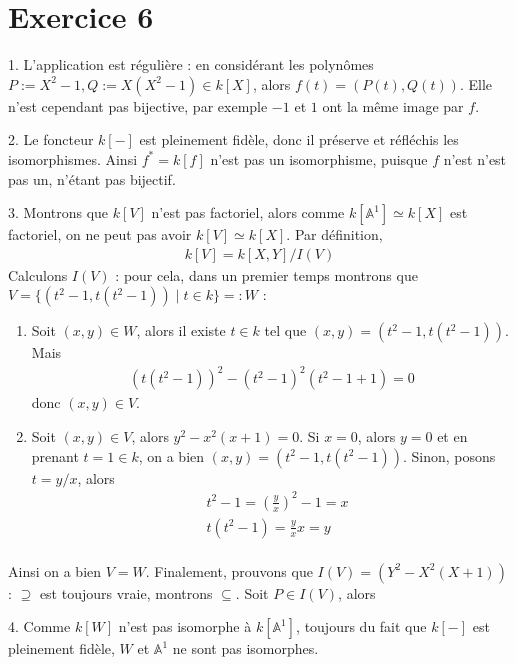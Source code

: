     \section{Exercice 6}
        \begin{question}{1.}
            L'application est régulière : en considérant les polynômes $P := X^2 - 1, Q := X(X^2 - 1) \in k[X]$, alors $f(t) = (P(t), Q(t))$. Elle n'est cependant pas bijective, par exemple $-1$ et $1$ ont la même image par $f$.
        \end{question}
        \begin{question}{2.}
            Le foncteur $k[-]$ est pleinement fidèle, donc il préserve et réfléchis les isomorphismes. Ainsi $f^* = k[f]$ n'est pas un isomorphisme, puisque $f$ n'est n'est pas un, n'étant pas bijectif.
        \end{question}
        \begin{question}{3.}
            Montrons que $k[V]$ n'est pas factoriel, alors comme $k[\mathbb{A}^1] \simeq k[X]$ est factoriel, on ne peut pas avoir $k[V] \simeq k[X]$. Par définition,
            \begin{align*}
                k[V] = k[X,Y]/I(V)
            \end{align*}
            Calculons $I(V)$ : pour cela, dans un premier temps montrons que $V = \{(t^2 - 1, t(t^2 - 1)) \mid t \in k \} =: W$ :
            \begin{enumerate}
                \item Soit $(x,y) \in W$, alors il existe $t \in k$ tel que $(x,y) = (t^2 - 1, t(t^2 - 1))$. Mais
                \begin{align*}
                    (t(t^2 - 1))^2 - (t^2 - 1)^2(t^2 - 1 + 1)= 0
                \end{align*}
                donc $(x,y) \in V$.
                \item Soit $(x,y) \in V$, alors $y^2 - x^2(x+1) = 0$. Si $x = 0$, alors $y = 0$ et en prenant $t = 1 \in k$, on a bien $(x,y) = (t^2 - 1, t(t^2 - 1))$. Sinon, posons $t = y/x$, alors 
                \begin{align*}
                    &t^2 - 1 = \left( \frac yx \right)^2 - 1 = x \\
                    &t(t^2 - 1) = \frac yx x = y \\
                \end{align*}
            \end{enumerate}
            Ainsi on a bien $V = W$. Finalement, prouvons que $I(V) = (Y^2 - X^2(X + 1))$ : $\supseteq$ est toujours vraie, montrons $\subseteq$. Soit $P \in I(V)$, alors 
        \end{question}
        \begin{question}{4.}
            Comme $k[W]$ n'est pas isomorphe à $k[\mathbb{A}^1]$, toujours du fait que $k[-]$ est pleinement fidèle, $W$ et $\mathbb{A}^1$ ne sont pas isomorphes.
        \end{question}


